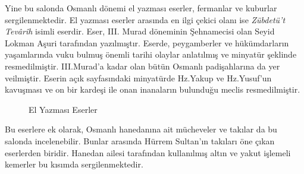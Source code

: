 \indent Yine bu salonda Osmanlı dönemi el yazması eserler, fermanlar ve kuburlar sergilenmektedir. El yazması eserler arasında en ilgi çekici olanı ise \textit{Zübdetü't Tevârîh} isimli eserdir. Eser, III. Murad döneminin Şehnamecisi olan Seyid Lokman Aşuri tarafından yazılmıştır. Eserde, peygamberler ve hükümdarların yaşamlarında vuku bulmuş önemli tarihi olaylar anlatılmış ve minyatür şeklinde resmedilmiştir. III.Murad'a kadar olan bütün Osmanlı padişahlarına da yer veilmiştir. Eserin açık sayfasındaki minyatürde Hz.Yakup ve Hz.Yusuf'un kavuşması ve  on bir kardeşi ile onan inanaların bulunduğu meclis resmedilmiştir.\newline
\begin{figure}[H]
    \centering
    \caption{El Yazması Eserler}
\end{figure}
\indent Bu eserlere ek olarak, Osmanlı hanedanına ait mücheveler ve takılar da bu salonda incelenebilir. Bunlar arasında Hürrem Sultan'ın takıları öne çıkan eserlerden biridir. Hanedan ailesi tarafından kullanılmış altın ve yakut işlemeli kemerler bu kısımda sergilenmektedir.
